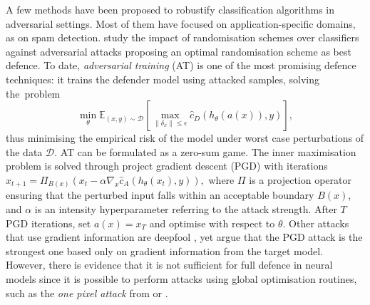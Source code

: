 A few methods have been proposed to robustify classification algorithms in adversarial settings. Most of them have focused on application-specific domains, as \cite{Kocz2009FeatureWF} on spam detection. \cite{Vorobeychik:2014:ORC:2615731.2615811} study the impact of randomisation schemes over classifiers against adversarial attacks proposing an optimal randomisation scheme as best defence.
 To date, 
\emph{adversarial training} (AT) \cite{madry2018towards}
is one of the most promising defence techniques:
 it trains the defender model using attacked samples,
solving the~problem
%
\begin{equation*}
    \min_{\theta} \mathbb{E}_{(x,y) \sim \mathcal{D}} \left[ \max_{\| \delta_x \| \leq \epsilon} \widehat{c}_D(h_{\theta} (a(x)), y) \right],
\end{equation*}
%
thus minimising the empirical risk of the model under worst case perturbations of the data $\mathcal{D}$.
AT can be formulated as a zero-sum game. The inner maximisation problem is solved through project gradient descent (PGD) with iterations 
$
x_{t+1} = \Pi_{B(x)} (x_t - \alpha \nabla_x  \widehat{c}_A(h_{\theta} (x_t), y)),
$
where $\Pi$ is a projection operator ensuring that the perturbed input falls within an acceptable boundary $B(x)$,  and $\alpha$ is an intensity hyperparameter referring to the attack strength. After $T$ PGD iterations, set $a(x) = x_T$ and optimise with respect to $\theta$.   Other attacks that use gradient information are deepfool \cite{moosavi2016deepfool}, yet \cite{madry2018towards} argue that the PGD attack is the strongest one based only on gradient information from the target model. However, there is evidence that it is not sufficient for full defence in neural models since it is possible to perform attacks using global optimisation routines, such as the \emph{one pixel attack} from \cite{su2019one} or \cite{gowal2018ibp}.%



